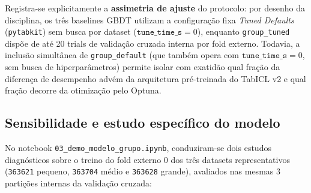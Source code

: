 \documentclass[11pt,a4paper]{article}
\begin{document}
Registra-se explicitamente a \textbf{assimetria de ajuste} do protocolo: por desenho da disciplina, os três baselines GBDT utilizam a configuração fixa \emph{Tuned Defaults} (\texttt{pytabkit}) sem busca por dataset ($\texttt{tune\_time\_s} = 0$), enquanto \texttt{group\_tuned} dispõe de até 20 trials de validação cruzada interna por fold externo. Todavia, a inclusão simultânea de \texttt{group\_default} (que também opera com $\texttt{tune\_time\_s} = 0$, sem busca de hiperparâmetros) permite isolar com exatidão qual fração da diferença de desempenho advém da arquitetura pré-treinada do TabICL v2 e qual fração decorre da otimização pelo Optuna.

\subsection{Sensibilidade e estudo específico do modelo}
\label{sec:sensibilidade}

No notebook \texttt{03\_demo\_modelo\_grupo.ipynb}, conduziram-se dois estudos diagnósticos sobre o treino do fold externo 0 dos três datasets representativos (\texttt{363621} pequeno, \texttt{363704} médio e \texttt{363628} grande), avaliados nas mesmas 3 partições internas da validação cruzada:
\end{document}
